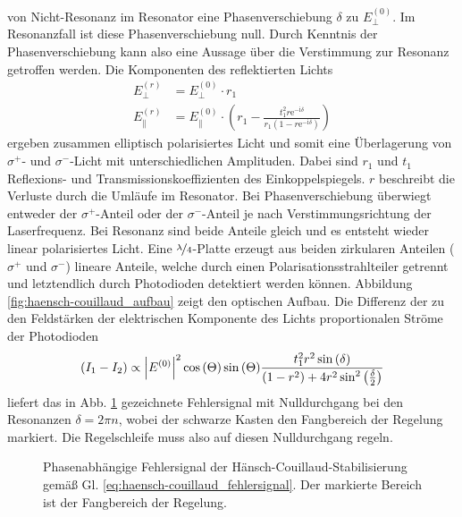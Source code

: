 von Nicht-Resonanz im Resonator eine Phasenverschiebung $\delta$ zu $E_{\perp}^{(0)}$. Im Resonanzfall ist diese Phasenverschiebung null. Durch Kenntnis der Phasenverschiebung kann also eine Aussage über die Verstimmung zur Resonanz getroffen werden. Die
Komponenten des reflektierten Lichts
\begin{equation}\label{eq:haensch-couillaud_02}
	\begin{split}
		E_{\perp}^{(r)} & = E_{\perp}^{(0)}\cdot r_1\\
		E_{\parallel}^{(r)} & = E_{\parallel}^{(0)}\cdot\left(r_1-\frac{t_1^2r\mathrm{e}^{-\mathrm{i}\delta}}{r_1\left(1-r\mathrm{e}^{-\mathrm{i}\delta}\right)}\right)
	\end{split}
\end{equation}
ergeben zusammen elliptisch polarisiertes Licht und somit eine Überlagerung von
$\sigma^+$- und $\sigma^-$-Licht mit unterschiedlichen Amplituden. Dabei sind
$r_1$ und $t_1$ Reflexions- und Transmissionskoeffizienten des
Einkoppelspiegels. $r$ beschreibt die Verluste durch die Umläufe im Resonator.
Bei Phasenverschiebung überwiegt entweder der $\sigma^+$-Anteil oder der
$\sigma^-$-Anteil je nach Verstimmungsrichtung der Laserfrequenz.
Bei Resonanz sind beide Anteile gleich und es entsteht wieder linear
polarisiertes Licht. Eine $\nicefrac{\lambda}{4}$-Platte erzeugt aus beiden zirkularen Anteilen ($\sigma^+$ und $\sigma^-$) lineare Anteile, welche durch einen Polarisationsstrahlteiler getrennt und letztendlich durch Photodioden detektiert werden können. Abbildung \ref{fig:haensch-couillaud_aufbau} zeigt den
optischen Aufbau. Die Differenz der zu den Feldstärken der elektrischen Komponente
des Lichts proportionalen Ströme der Photodioden
\begin{equation}\label{eq:haensch-couillaud_fehlersignal}
	(I_1-I_2)\propto\left|E^{(0)}\right|^2\cos{(\Theta)}\sin{(\Theta)}\frac{t_1^2r^2\sin{(\delta)}}{(1-r^2)+4r^2\sin^2{\left(\frac{\delta}{2}\right)}}
\end{equation}
liefert das in Abb. \ref{fig:haensch-couillaud_fehlersignal} gezeichnete
Fehlersignal mit Nulldurchgang bei den Resonanzen $\delta=2\pi n$, wobei der
schwarze Kasten den Fangbereich der Regelung markiert. Die Regelschleife muss
also auf diesen Nulldurchgang regeln.
\begin{figure}[h]
	\centering
	\footnotesize
	
	\caption[Hänsch-Couillaud-Stabilisierung - Fehlersignal]{Phasenabhängige
	Fehlersignal der Hänsch-Couillaud-Stabilisierung gemäß Gl. \eqref{eq:haensch-couillaud_fehlersignal}.
	Der markierte Bereich ist der
	Fangbereich der Regelung.}
	\label{fig:haensch-couillaud_fehlersignal}
\end{figure}

